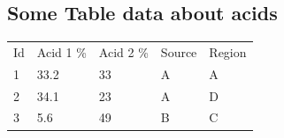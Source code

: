 \documentclass[a4paper,11pt]{article}
\begin{document}
\subsection{Some Table data about acids}

\begin{table}[H]
\begin{tabular}{lllll}
Id & Acid 1 \% & Acid 2 \% & Source & Region \\
1  & 33.2      & 33        & A      & A      \\
2  & 34.1      & 23        & A      & D      \\
3  & 5.6       & 49        & B      & C     
\end{tabular}
\end{table}
\printbibliography
\end{document}
